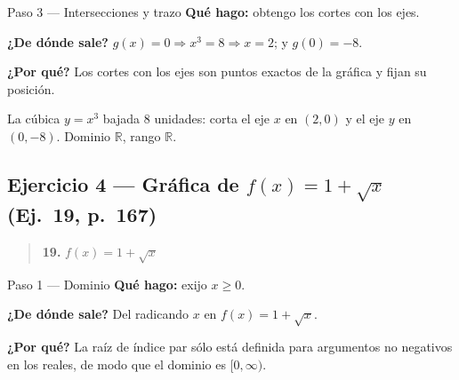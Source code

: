 \documentclass[11pt]{article}
\begin{document}
\begin{paso}{Paso 3 --- Intersecciones y trazo}
\textbf{Qué hago:} obtengo los cortes con los ejes.

\textbf{¿De dónde sale?} $g(x)=0 \Rightarrow x^3=8 \Rightarrow x=2$; y $g(0)=-8$.

\textbf{¿Por qué?} Los cortes con los ejes son puntos exactos de la gráfica y fijan su posición.

\begin{center}
\end{center}
\end{paso}

\begin{resp}
La cúbica $y=x^3$ bajada $8$ unidades: corta el eje $x$ en $(2,0)$ y el eje $y$ en $(0,-8)$. Dominio $\mathbb{R}$, rango $\mathbb{R}$.
\end{resp}

\subsection*{Ejercicio 4 — Gráfica de $f(x)=1+\sqrt{x}$ (Ej.~19, p.~167)}

\begin{quote}
\textbf{19.} $f(x)=1+\sqrt{x}$
\end{quote}

\begin{paso}{Paso 1 --- Dominio}
\textbf{Qué hago:} exijo $x\ge 0$.

\textbf{¿De dónde sale?} Del radicando $x$ en $f(x)=1+\sqrt{x}$.

\textbf{¿Por qué?} La raíz de índice par sólo está definida para argumentos no negativos en los reales, de modo que el dominio es $[0,\infty)$.
\end{paso}
\end{document}
